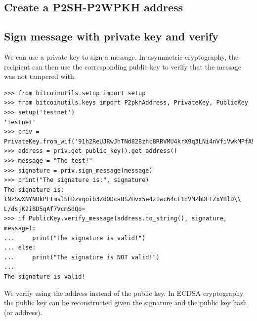 \subsection*{Create a P2SH-P2WPKH address}

\subsection*{Sign message with private key and verify}
We can use a private key to sign a message. In asymmetric cryptography, the recipient can then use the corresponding public key to verify that the message was not tampered with.

\vspace{1em}
\begin{lstlisting}[style=Python,label={lst:sign-verify-message},caption={Use public key to sign a message and them verify},captionpos=b]
>>> from bitcoinutils.setup import setup
>>> from bitcoinutils.keys import P2pkhAddress, PrivateKey, PublicKey
>>> setup('testnet')
'testnet'
>>> priv = PrivateKey.from_wif('91h2ReUJRwJhTNd828zhc8RRVMU4krX9q3LNi4nVfiVwkMPfA9p')
>>> address = priv.get_public_key().get_address()
>>> message = "The test!"
>>> signature = priv.sign_message(message)
>>> print("The signature is:", signature)
The signature is: INzSwXNYNUkPFImslSFDzvqoib3ZdODcaBSZHvx5e4z1wc64cF1dVMZbDFtZxYBlD\\
L/dsjK2iBD5qAf7VcmSdQo=
>>> if PublicKey.verify_message(address.to_string(), signature, message):
...     print("The signature is valid!")
... else:
...     print("The signature is NOT valid!")
...
The signature is valid!
\end{lstlisting}
\vspace{1em}

\begin{note}
We verify using the address instead of the public key. In ECDSA cryptography the public key can be reconstructed given the signature and the public key hash (or address).
\end{note}


